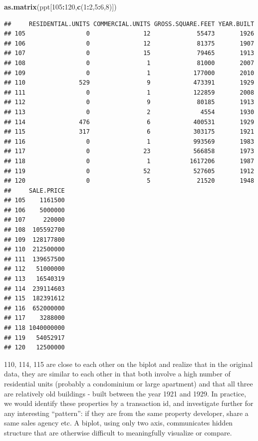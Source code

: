 \documentclass[]{article}
\newenvironment{Shaded}{\begin{snugshade}}{\end{snugshade}}
\newcommand{\DecValTok}[1]{\textcolor[rgb]{0.00,0.00,0.81}{#1}}
\newcommand{\KeywordTok}[1]{\textcolor[rgb]{0.13,0.29,0.53}{\textbf{#1}}}
\newcommand{\NormalTok}[1]{#1}
\newcommand{\OperatorTok}[1]{\textcolor[rgb]{0.81,0.36,0.00}{\textbf{#1}}}
\begin{document}
\begin{Shaded}
\begin{Highlighting}[]
\KeywordTok{as.matrix}\NormalTok{(ppt[}\DecValTok{105}\OperatorTok{:}\DecValTok{120}\NormalTok{,}\KeywordTok{c}\NormalTok{(}\DecValTok{1}\OperatorTok{:}\DecValTok{2}\NormalTok{,}\DecValTok{5}\OperatorTok{:}\DecValTok{6}\NormalTok{,}\DecValTok{8}\NormalTok{)])}
\end{Highlighting}
\end{Shaded}

\begin{verbatim}
##     RESIDENTIAL.UNITS COMMERCIAL.UNITS GROSS.SQUARE.FEET YEAR.BUILT
## 105                 0               12             55473       1926
## 106                 0               12             81375       1907
## 107                 0               15             79465       1913
## 108                 0                1             81000       2007
## 109                 0                1            177000       2010
## 110               529                9            473391       1929
## 111                 0                1            122859       2008
## 112                 0                9             80185       1913
## 113                 0                2              4554       1930
## 114               476                6            400531       1929
## 115               317                6            303175       1921
## 116                 0                1            993569       1983
## 117                 0               23            566858       1973
## 118                 0                1           1617206       1987
## 119                 0               52            527605       1912
## 120                 0                5             21520       1948
##     SALE.PRICE
## 105    1161500
## 106    5000000
## 107     220000
## 108  105592700
## 109  128177800
## 110  212500000
## 111  139657500
## 112   51000000
## 113   16540319
## 114  239114603
## 115  182391612
## 116  652000000
## 117    3288000
## 118 1040000000
## 119   54052917
## 120   12500000
\end{verbatim}

110, 114, 115 are close to each other on the biplot and realize that in
the original data, they are similar to each other in that both involve a
high number of residential units (probably a condominium or large
apartment) and that all three are relatively old buildings - built
between the year 1921 and 1929. In practice, we would identify these
properties by a transaction id, and investigate further for any
interesting ``pattern'': if they are from the same property developer,
share a same sales agency etc. A biplot, using only two axis,
communicates hidden structure that are otherwise difficult to
meaningfully visualize or compare.
\end{document}
